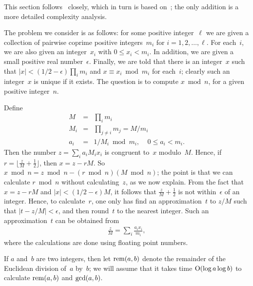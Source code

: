 \documentclass{amsart}
\newcommand{\noi}{\noindent}
\newcommand{\bigo}{{\rm O}}
\newcommand{\rem}{{\rm rem}}
\theoremstyle{plain}
\begin{document}
This section follows~\cite[\S2.1]{couv} closely,
which in turn is based on~\cite[\S4]{mont-silv}; the only addition
is a more detailed complexity analysis.

The problem we consider is as follows: for some positive integer~$\ell$ 
we are given a collection
of pairwise coprime positive integers~$m_i$ for $i=1,2, \ldots, \ell$.
For each~$i$, we are also given an integer~$x_i$ with $0 \leq x_i < m_i$. 
In addition, we are given 
a small positive real number~$\epsilon$. Finally, we are told that there is 
an integer~$x$ 
such that $|x| < (1/2 -\epsilon) \prod_i m_i$
and $x \equiv x_i \bmod m_i$ for each~$i$; clearly such an integer~$x$
is unique if it exists. The question is to compute $x \bmod n$,
for a given positive integer~$n$.

Define
\begin{eqnarray}
\label{eqnM} M &=& \prod_i m_i \\
\label{eqnMi} M_i &=& \prod_{j \neq i} m_j = M/m_i \\
\label{eqna} a_i &=& 1/M_i \bmod m_i, \ \ \ \ \ 0\leq a_i < m_i.
\end{eqnarray}
Then the number $z = \sum_i a_i M_i x_i$ is congruent to~$x$
modulo~$M$. 
Hence, if $r = \big \lfloor \frac{z}{M} + \frac{1}{2} \big \rfloor$, 
then $x = z - r M$. 
So $x \bmod n = z \bmod n - (r \bmod n)(M \bmod n)$;
the point is that we can calculate $r \bmod n$ without calculating~$z$,
as we now explain. 
 From the fact that
$x = z - rM$ and $|x| < (1/2 -\epsilon) M$, it follows
that $\frac{z}{M} + \frac{1}{2}$ is not within~$\epsilon$ of
an integer. Hence, to calculate~$r$, one only has find an approximation~$t$
to $z/M$ such that $|t - z/M| < \epsilon$, 
and then round~$t$ to the nearest integer. Such an approximation~$t$
can be obtained from 
\begin{eqnarray} \label{eqnzM}
\frac{z}{M} = \sum_i \frac{a_i x_i}{m_i},
\end{eqnarray} 
where the calculations are done using floating point numbers.

If $a$ and~$b$ are two integers, then 
let $\rem(a,b)$ denote the remainder of the Euclidean division
of~$a$ by~$b$; we will assume that it takes time $\bigo(\log a \log b)$
to calculate $\rem(a,b)$ and ${\rm gcd}(a,b)$. 

\end{document}
